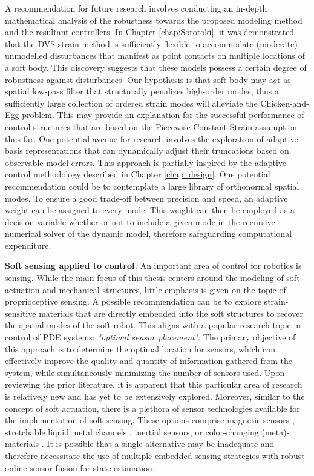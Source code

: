 A recommendation for future research involves conducting an in-depth mathematical analysis of the robustness towards the proposed modeling method and the resultant controllers. In Chapter \ref{chap:Sorotoki}, it was demonstrated that the DVS strain method is sufficiently flexible to accommodate (moderate) unmodelled disturbances that manifest as point contacts on multiple locations of a soft body. This discovery suggests that these models possess a certain degree of robustness against disturbances. Our hypothesis is that soft body may act as spatial low-pass filter that structurally penalizes high-order modes, thus a sufficiently large collection of ordered strain modes will alleviate the {Chicken-and-Egg} problem. This may provide an explanation for the successful performance of control structures that are based on the Piecewise-Constant Strain assumption thus far. One potential avenue for research involves the exploration of adaptive basis representations that can dynamically adjust their truncations based on observable model errors. This approach is partially inspired by the adaptive control methodology described in Chapter \ref{chap: design}. One potential recommendation could be to contemplate a large library of orthonormal spatial modes. To ensure a good trade-off between precision and speed, an adaptive weight can be assigned to every mode. This weight can then be employed as a decision variable whether or not to include a given mode in the recursive numerical solver of the dynamic model, therefore safeguarding computational expenditure.

\textbf{Soft sensing applied to control.} An important area of control for robotics is sensing. While the main focus of this thesis centers around the modeling of soft actuation and mechanical structures, little emphasis is given on the topic of proprioceptive sensing. A possible recommendation can be to explore strain-sensitive materials that are directly embedded into the soft structures to recover the spatial modes of the soft robot. This aligns with a popular research topic in control of PDE systems: \textit{"optimal sensor placement"}. The primary objective of this approach is to determine the optimal location for sensors, which can effectively improve the quality and quantity of information gathered from the system, while simultaneously minimizing the number of sensors used. Upon reviewing the prior literature, it is apparent that this particular area of research is relatively new and has yet to be extensively explored. Moreover, similar to the concept of soft actuation, there is a plethora of sensor technologies available for the implementation of soft sensing. These options comprise magnetic sensors \cite{Felt2015Oct,Felt2019Feb,Baaij2023}, stretchable liquid metal channels \cite{Park2012,Tapia2020}, inertial sensors, or color-changing (meta)-materials \cite{Scharff2019Jul}. It is possible that a single alternative may be inadequate and therefore necessitate the use of multiple embedded sensing strategies with robust online sensor fusion for state estimation.

